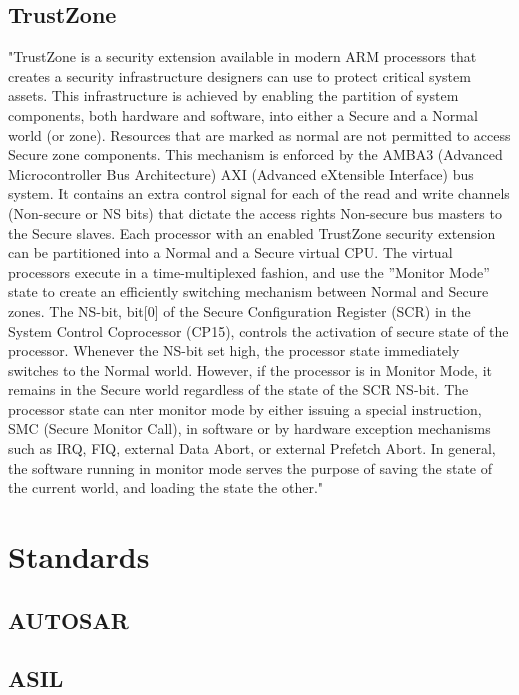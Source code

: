 \subsection{TrustZone}
\label{sec:trustzone}
"TrustZone is a security extension available in modern ARM processors that creates a security infrastructure designers can use to protect critical system assets. This infrastructure is achieved by enabling the partition of system components, both hardware and software, into either a Secure and a Normal world (or zone). Resources that are marked as normal are not permitted to access Secure zone components. This mechanism is enforced by the AMBA3 (Advanced Microcontroller Bus Architecture) AXI (Advanced eXtensible Interface) bus system. It contains an extra control signal for each of the read and write channels (Non-secure or NS bits) that dictate the access rights Non-secure bus masters to the Secure slaves. Each processor with an enabled TrustZone security extension can be partitioned into a Normal and a Secure virtual CPU. The virtual processors execute in a time-multiplexed fashion, and use the ”Monitor Mode” state to create an efficiently switching mechanism between Normal and Secure zones. The NS-bit, bit[0] of the Secure Configuration Register (SCR) in the System Control Coprocessor (CP15), controls the activation of secure state of the processor. Whenever the NS-bit set high, the processor state immediately switches to the Normal world. However, if the processor is in Monitor Mode, it remains in the Secure world regardless of the state of the SCR NS-bit. The processor state can nter monitor mode by either issuing a special instruction, SMC (Secure Monitor Call), in software or by hardware exception mechanisms such as IRQ, FIQ, external Data Abort, or external Prefetch Abort. In general, the software running in monitor mode serves the purpose of saving the state of the current world, and loading the state the other."~\cite{website:ARM} \\ %

\section{Standards}

\subsection{AUTOSAR}

\subsection{ASIL}